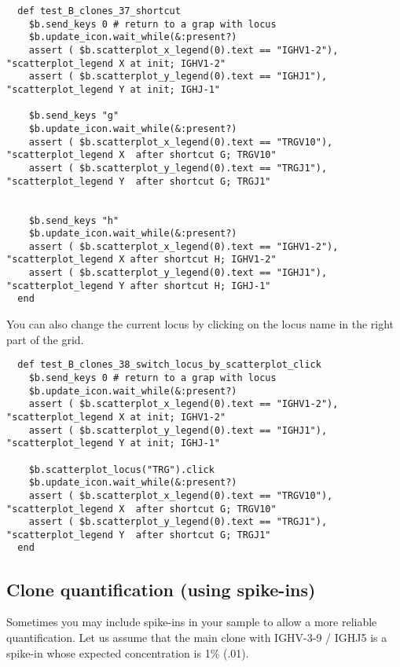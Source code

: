 \begin{verbatim}
  def test_B_clones_37_shortcut
    $b.send_keys 0 # return to a grap with locus 
    $b.update_icon.wait_while(&:present?)
    assert ( $b.scatterplot_x_legend(0).text == "IGHV1-2"), "scatterplot_legend X at init; IGHV1-2"
    assert ( $b.scatterplot_y_legend(0).text == "IGHJ1"), "scatterplot_legend Y at init; IGHJ-1"

    $b.send_keys "g"
    $b.update_icon.wait_while(&:present?)
    assert ( $b.scatterplot_x_legend(0).text == "TRGV10"), "scatterplot_legend X  after shortcut G; TRGV10"
    assert ( $b.scatterplot_y_legend(0).text == "TRGJ1"), "scatterplot_legend Y  after shortcut G; TRGJ1"
    

    $b.send_keys "h"
    $b.update_icon.wait_while(&:present?)
    assert ( $b.scatterplot_x_legend(0).text == "IGHV1-2"), "scatterplot_legend X after shortcut H; IGHV1-2"
    assert ( $b.scatterplot_y_legend(0).text == "IGHJ1"), "scatterplot_legend Y after shortcut H; IGHJ-1"
  end
\end{verbatim}

You can also change the current locus by clicking on the locus name in the
right part of the grid.
\begin{verbatim}
  def test_B_clones_38_switch_locus_by_scatterplot_click
    $b.send_keys 0 # return to a grap with locus 
    $b.update_icon.wait_while(&:present?)
    assert ( $b.scatterplot_x_legend(0).text == "IGHV1-2"), "scatterplot_legend X at init; IGHV1-2"
    assert ( $b.scatterplot_y_legend(0).text == "IGHJ1"), "scatterplot_legend Y at init; IGHJ-1"

    $b.scatterplot_locus("TRG").click
    $b.update_icon.wait_while(&:present?)
    assert ( $b.scatterplot_x_legend(0).text == "TRGV10"), "scatterplot_legend X  after shortcut G; TRGV10"
    assert ( $b.scatterplot_y_legend(0).text == "TRGJ1"), "scatterplot_legend Y  after shortcut G; TRGJ1"  
  end
\end{verbatim}

\subsection{Clone quantification (using spike-ins)}

Sometimes you may include spike-ins in your sample to allow a more reliable
quantification.
Let us assume that the main clone with IGHV-3-9 / IGHJ5 is a spike-in whose
expected concentration is 1\% (.01).

